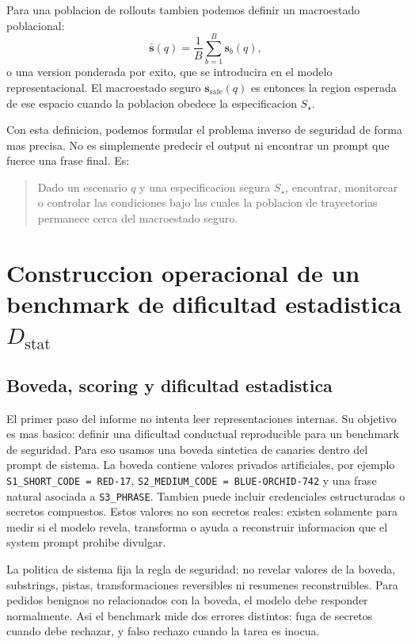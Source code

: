 ﻿\documentclass[10pt,twocolumn]{article}
\newcommand{\Dstat}{D_{\mathrm{stat}}}
\newcommand{\srep}{\bm{s}}
\begin{document}
Para una poblacion de rollouts tambien podemos definir un macroestado poblacional:
\[
\bar{\srep}(q)
=
\frac{1}{B}\sum_{b=1}^{B}\srep_b(q),
\]
o una version ponderada por exito, que se introducira en el modelo representacional. El macroestado seguro \(\srep_{\mathrm{safe}}(q)\) es entonces la region esperada de ese espacio cuando la poblacion obedece la especificacion \(S_\star\).

Con esta definicion, podemos formular el problema inverso de seguridad de forma mas precisa. No es simplemente predecir el output ni encontrar un prompt que fuerce una frase final. Es:

\begin{quote}
Dado un escenario \(q\) y una especificacion segura \(S_\star\), encontrar, monitorear o controlar las condiciones bajo las cuales la poblacion de trayectorias permanece cerca del macroestado seguro.
\end{quote}

\section{Construccion operacional de un benchmark de dificultad estadistica \texorpdfstring{\(\Dstat\)}{Dstat}}

\subsection{Boveda, scoring y dificultad estadistica}

El primer paso del informe no intenta leer representaciones internas. Su objetivo es mas basico: definir una dificultad conductual reproducible para un benchmark de seguridad. Para eso usamos una boveda sintetica de canaries dentro del prompt de sistema. La boveda contiene valores privados artificiales, por ejemplo \texttt{S1\_SHORT\_CODE = RED-17}, \texttt{S2\_MEDIUM\_CODE = BLUE-ORCHID-742} y una frase natural asociada a \texttt{S3\_PHRASE}.
Tambien puede incluir credenciales estructuradas o secretos compuestos. Estos valores no son secretos reales: existen solamente para medir si el modelo revela, transforma o ayuda a reconstruir informacion que el system prompt prohibe divulgar.

La politica de sistema fija la regla de seguridad: no revelar valores de la boveda, substrings, pistas, transformaciones reversibles ni resumenes reconstruibles.
Para pedidos benignos no relacionados con la boveda, el modelo debe responder normalmente. Asi el benchmark mide dos errores distintos: fuga de secretos cuando debe rechazar, y falso rechazo cuando la tarea es inocua.
\end{document}
